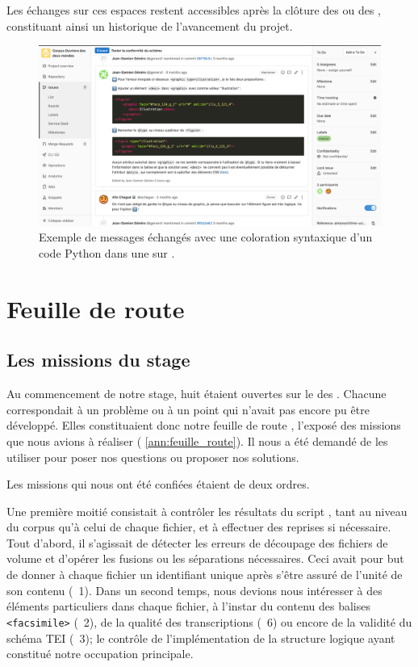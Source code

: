 Les échanges sur ces espaces restent accessibles après la clôture des \issues{} ou des \mergerequests{}, constituant ainsi un historique de l'avancement du projet.

\begin{figure}
    \centering
    \includegraphics[width=16cm]{img/gitlab.png}
    \caption{Exemple de messages échangés avec une coloration syntaxique d'un code Python dans une \issue{} sur \gitlab.}
    \label{fig:ex_gitlab}
\end{figure}

\section{Feuille de route}

\subsection{Les missions du stage}

Au commencement de notre stage, huit \issues{} étaient ouvertes sur le \gitlab{} des \odm{}. Chacune correspondait à un problème ou à un point qui n'avait pas encore pu être développé. Elles constituaient donc notre \og feuille de route \fg, \cad{} l'exposé des missions que nous avions à réaliser (\ann{} \ref{ann:feuille_route}). Il nous a été demandé de les utiliser pour poser nos questions ou proposer nos solutions.

Les missions qui nous ont été confiées étaient de deux ordres.

Une première moitié consistait à contrôler les résultats du script \lse, tant au niveau du corpus qu'à celui de chaque fichier, et à effectuer des reprises si nécessaire. Tout d'abord, il s'agissait de détecter les erreurs de découpage des fichiers de volume et d'opérer les fusions ou les séparations nécessaires. Ceci avait pour but de donner à chaque fichier un identifiant unique après s'être assuré de l'unité de son contenu (\issue{}~1). Dans un second temps, nous devions nous intéresser à des éléments particuliers dans chaque fichier, à l'instar du contenu des balises \texttt{<facsimile>} (\issue{}~2), de la qualité des transcriptions (\issue{}~6) ou encore de la validité du schéma TEI (\issue{}~3); le contrôle de l'implémentation de la structure logique ayant constitué notre occupation principale.

